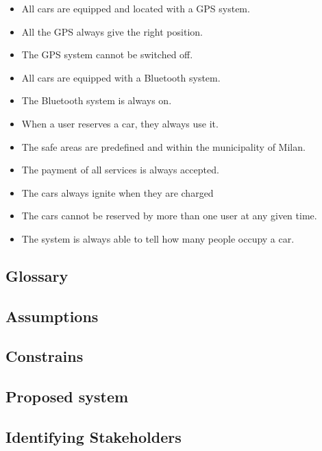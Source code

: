 \documentclass{article}
\begin{document}
			\begin{itemize}
				\item All cars are equipped and located with a GPS system.
				\item All the GPS always give the right position.
				\item The GPS system cannot be switched off.
				\item All cars are equipped with a Bluetooth system.
				\item The Bluetooth system is always on.
				\item When a user reserves a car, they always use it. %
				\item The safe areas are predefined and within the municipality of Milan.
				\item The payment of all services is always accepted. %
				\item The cars always ignite when they are charged %
				\item The cars cannot be reserved by more than one user at any given time. %
				\item The system is always able to tell how many people occupy a car. 
			\end{itemize}

		\subsection{Glossary}

		\subsection{Assumptions}

		\subsection{Constrains}

		\subsection{Proposed system}

		\subsection{Identifying Stakeholders}
\end{document}
